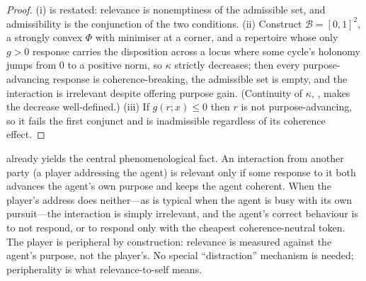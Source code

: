 \documentclass[11pt,twocolumn,a4paper]{article}
\newcommand{\Beh}{\mathcal{B}}       %
\newcommand{\drive}{\Phi}            %
\newcommand{\resp}{r}                %
\newcommand{\gain}{g}                %
\newcommand{\coh}{\kappa}            %
\begin{document}
\begin{proof}
(i) is  restated: relevance is nonemptiness of the
admissible set, and admissibility is the conjunction of the two
conditions. (ii) Construct $\Beh=[0,1]^2$, a strongly convex $\drive$ with
minimiser at a corner, and a repertoire whose only $\gain>0$ response
carries the disposition across a locus where some cycle's holonomy jumps
from $0$ to a positive norm, so $\coh$ strictly decreases; then every
purpose-advancing response is coherence-breaking, the admissible set is
empty, and the interaction is irrelevant despite offering purpose gain.
(Continuity of $\coh$, , makes the decrease well-defined.)
(iii) If $\gain(\resp;x)\le0$ then $\resp$ is not purpose-advancing, so it
fails the first conjunct and is inadmissible regardless of its coherence
effect.
\end{proof}

\begin{remark}
\label{rem:peripheral}
 already yields the central phenomenological fact.
An interaction from another party (a player addressing the agent) is
relevant only if some response to it both advances the agent's own purpose
and keeps the agent coherent. When the player's address does neither---as
is typical when the agent is busy with its own pursuit---the interaction
is simply irrelevant, and the agent's correct behaviour is to not respond,
or to respond only with the cheapest coherence-neutral token. The player
is peripheral by construction: relevance is measured against the agent's
purpose, not the player's. No special ``distraction'' mechanism is needed;
peripherality is what relevance-to-self means.
\end{remark}
\end{document}
